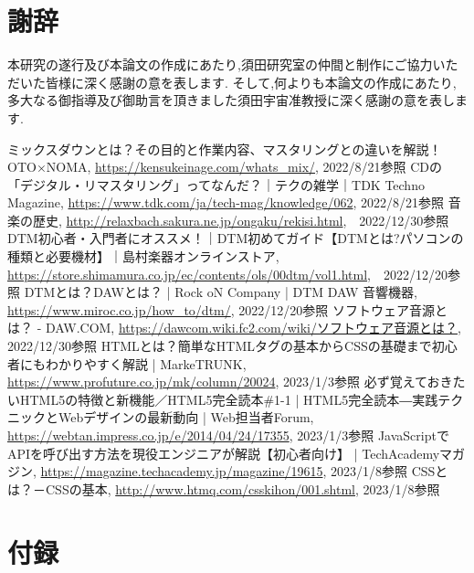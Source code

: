 \documentclass[12pt,a4j,titlepage]{ltjsarticle}
\begin{document}
\newpage
\section{謝辞}
本研究の遂行及び本論文の作成にあたり,須田研究室の仲間と制作にご協力いただいた皆様に深く感謝の意を表します.
そして,何よりも本論文の作成にあたり,多大なる御指導及び御助言を頂きました須田宇宙准教授に深く感謝の意を表します.

\newpage
\begin{thebibliography}{99}
 ミックスダウンとは？その目的と作業内容、マスタリングとの違いを解説！ OTO×NOMA, \url{https://kensukeinage.com/whats_mix/}, 2022/8/21参照
 CDの「デジタル・リマスタリング」ってなんだ？｜テクの雑学｜TDK Techno Magazine, \url{https://www.tdk.com/ja/tech-mag/knowledge/062}, 2022/8/21参照
 音楽の歴史, \url{http://relaxbach.sakura.ne.jp/ongaku/rekisi.html},　2022/12/30参照
 DTM初心者・入門者にオススメ！｜DTM初めてガイド【DTMとは?パソコンの種類と必要機材】｜島村楽器オンラインストア, \url{https://store.shimamura.co.jp/ec/contents/ols/00dtm/vol1.html},　2022/12/20参照
 DTMとは？DAWとは？ | Rock oN Company | DTM DAW 音響機器, \url{https://www.miroc.co.jp/how_to/dtm/}, 2022/12/20参照
 ソフトウェア音源とは？ - DAW.COM, \url{https://dawcom.wiki.fc2.com/wiki/ソフトウェア音源とは？}, 2022/12/30参照
 HTMLとは？簡単なHTMLタグの基本からCSSの基礎まで初心者にもわかりやすく解説 | MarkeTRUNK, \url{https://www.profuture.co.jp/mk/column/20024}, 2023/1/3参照
 必ず覚えておきたいHTML5の特徴と新機能／HTML5完全読本\#1-1 | HTML5完全読本―実践テクニックとWebデザインの最新動向 | Web担当者Forum, \url{https://webtan.impress.co.jp/e/2014/04/24/17355}, 2023/1/3参照
 JavaScriptでAPIを呼び出す方法を現役エンジニアが解説【初心者向け】 | TechAcademyマガジン, \url{https://magazine.techacademy.jp/magazine/19615}, 2023/1/8参照
 CSSとは？－CSSの基本, \url{http://www.htmq.com/csskihon/001.shtml}, 2023/1/8参照
\end{thebibliography}

\newpage

\section*{付録}


\end{document}
